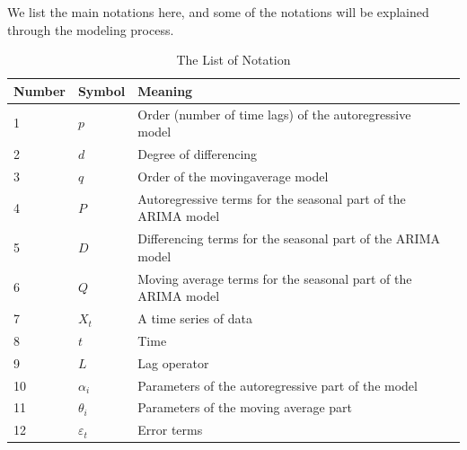 \documentclass{mcmthesis}
\begin{document}
We list the main notations here, and some of the notations will be explained through the modeling process.
\begin{center}
\begin{longtable}{p{}<{\centering} p{}<{\centering} 
p{}m{}}
\caption{The List of Notation}\\
\toprule[1.5pt]
Number& Symbol& Meaning \\
\midrule

1& $ p $    & Order (number of time lags) of the autoregressive model \\
2& $d$ &    Degree of differencing \\
3& $q$  &  Order of the movingaverage model \\
4& $P$ & Autoregressive terms for the seasonal part of the ARIMA model \\
5& $D$ & Differencing terms for the seasonal part of the ARIMA model \\
6& $Q$ & Moving average terms for the seasonal part of the ARIMA model \\

7& $X_t$      & A time series of data    \\                                                       
8& $t$      & Time  \\
                                                         
9& $L$     & Lag operator                                                     \\
10& $\alpha_i$       & Parameters of the autoregressive part of the model  \\                                         
11& $\theta_i $     & Parameters of the moving average part \\                                                            
12& $\varepsilon _{t}$       & Error terms                             \\



\end{longtable}
\end{center}
\end{document}
